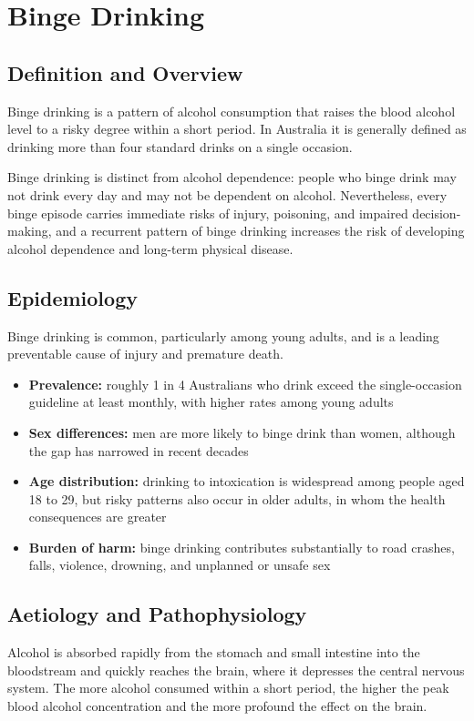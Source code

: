 \chapter{Binge Drinking}

\section*{Definition and Overview}
Binge drinking is a pattern of alcohol consumption that raises the blood alcohol level to a risky degree within a short period. In Australia it is generally defined as drinking more than four standard drinks on a single occasion.

Binge drinking is distinct from alcohol dependence: people who binge drink may not drink every day and may not be dependent on alcohol. Nevertheless, every binge episode carries immediate risks of injury, poisoning, and impaired decision-making, and a recurrent pattern of binge drinking increases the risk of developing alcohol dependence and long-term physical disease.

\section*{Epidemiology}
Binge drinking is common, particularly among young adults, and is a leading preventable cause of injury and premature death.

\begin{itemize}
    \item \textbf{Prevalence:} roughly 1 in 4 Australians who drink exceed the single-occasion guideline at least monthly, with higher rates among young adults
    \item \textbf{Sex differences:} men are more likely to binge drink than women, although the gap has narrowed in recent decades
    \item \textbf{Age distribution:} drinking to intoxication is widespread among people aged 18 to 29, but risky patterns also occur in older adults, in whom the health consequences are greater
    \item \textbf{Burden of harm:} binge drinking contributes substantially to road crashes, falls, violence, drowning, and unplanned or unsafe sex
\end{itemize}

\section*{Aetiology and Pathophysiology}
Alcohol is absorbed rapidly from the stomach and small intestine into the bloodstream and quickly reaches the brain, where it depresses the central nervous system. The more alcohol consumed within a short period, the higher the peak blood alcohol concentration and the more profound the effect on the brain.

